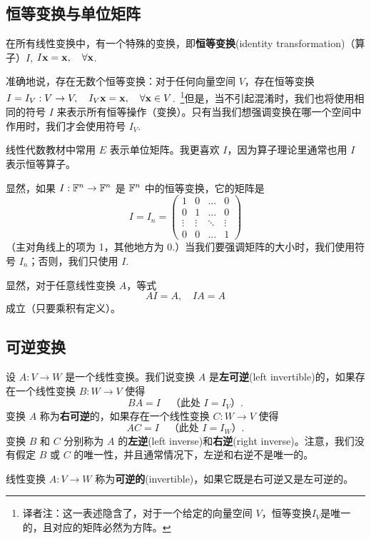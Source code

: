 \subsection{恒等变换与单位矩阵}\label{sec:01-06-01}

在所有线性变换中，有一个特殊的变换，即\textbf{恒等变换}(identity transformation)（算子）$I$, $I \mathbf{x} = \mathbf{x},\quad\forall \mathbf{x}$.

准确地说，存在无数个恒等变换：对于任何向量空间 $V$，存在恒等变换 $I = I_V: V \to V,\quad I_V \mathbf{x} = \mathbf{x},\quad\forall \mathbf{x} \in V$.~\footnote{
译者注：这一表述隐含了，对于一个给定的向量空间 $V$，恒等变换$I_V$是唯一的，且对应的矩阵必然为方阵。
}但是，当不引起混淆时，我们也将使用相同的符号 $I$ 来表示所有恒等操作（变换）。只有当我们想强调变换在哪一个空间中作用时，我们才会使用符号 $I_V$.~
\begin{remark*}
线性代数教材中常用 $E$ 表示单位矩阵。我更喜欢 $I$，因为算子理论里通常也用 $I$ 表示恒等算子。
\end{remark*}

显然，如果 $I: \mathbb{F}^n \to \mathbb{F}^n$ 是 $\mathbb{F}^n$ 中的恒等变换，它的矩阵是
$$
I = I_n = \begin{pmatrix}
1 & 0 & \dots & 0 \\
0 & 1 & \dots & 0 \\
\vdots & \vdots & \ddots & \vdots \\
0 & 0 & \dots & 1
\end{pmatrix}
$$
（主对角线上的项为 1，其他地方为 0.）当我们要强调矩阵的大小时，我们使用符号 $I_n$；否则，我们只使用 $I$.~

显然，对于任意线性变换 $A$，等式 $$AI = A,\quad IA = A$$ 成立（只要乘积有定义）。

\subsection{可逆变换}\label{sec:01-06-02}

\begin{definition*}
设 $A: V \to W$ 是一个线性变换。我们说变换 $A$ 是\textbf{左可逆}(left invertible)的，如果存在一个线性变换 $B: W \to V$ 使得
$$BA = I \quad\text{（此处 $I = I_V$）}.$$
变换 $A$ 称为\textbf{右可逆}的，如果存在一个线性变换 $C: W \to V$ 使得
$$
AC = I\quad\text{（此处 $I = I_W$）}.
$$
变换 $B$ 和 $C$ 分别称为 $A$ 的\textbf{左逆}(left inverse)和\textbf{右逆}(right inverse)。注意，我们没有假定 $B$ 或 $C$ 的唯一性，并且通常情况下，左逆和右逆不是唯一的。
\end{definition*}

\begin{definition*}
线性变换 $A: V \to W$ 称为\textbf{可逆的}(invertible)，如果它既是右可逆又是左可逆的。
\end{definition*}

